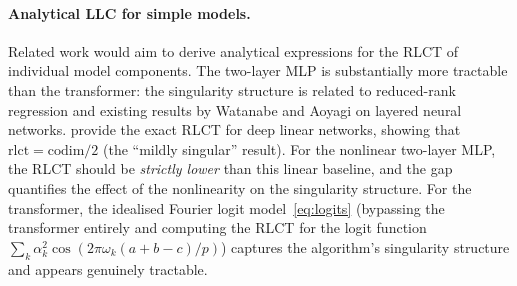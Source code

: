 \documentclass[11pt,a4paper]{article}
\begin{document}
\paragraph{Analytical LLC for simple models.} Related work would aim to derive analytical expressions for the RLCT of individual model components. The two-layer MLP is substantially more tractable than the transformer: the singularity structure is related to reduced-rank regression and existing results by Watanabe and Aoyagi on layered neural networks. \citet{pepinlehalleur2025geometry} provide the exact RLCT for deep linear networks, showing that $\mathrm{rlct} = \mathrm{codim}/2$ (the ``mildly singular'' result). For the nonlinear two-layer MLP, the RLCT should be \emph{strictly lower} than this linear baseline, and the gap quantifies the effect of the nonlinearity on the singularity structure. For the transformer, the idealised Fourier logit model~\eqref{eq:logits} (bypassing the transformer entirely and computing the RLCT for the logit function $\sum_k \alpha_k^2 \cos(2\pi\omega_k(a+b-c)/p)$) captures the algorithm's singularity structure and appears genuinely tractable.


\end{document}
